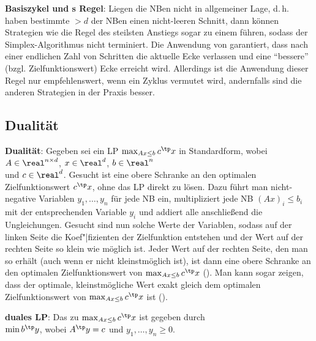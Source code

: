 \linie

\textbf{Basiszykel und s Regel}:
Liegen die NBen nicht in allgemeiner Lage, d.\,h. haben bestimmte $> d$ der NBen einen nicht-leeren
Schnitt, dann können Strategien wie die Regel des steilsten Anstiegs sogar zu einem
 führen, sodass der Simplex-Algorithmus nicht terminiert.
Die Anwendung von  garantiert, dass nach einer endlichen Zahl von
Schritten die aktuelle Ecke verlassen und eine "`bessere"' (bzgl. Zielfunktionswert) Ecke erreicht
wird.
Allerdings ist die Anwendung dieser Regel nur empfehlenswert, wenn ein Zyklus vermutet wird,
andernfalls sind die anderen Strategien in der Praxis besser.

\pagebreak

\subsection{%
    Dualität%
}

\textbf{Dualität}:
Gegeben sei ein LP $\max_{Ax \le b} c^\tp x$ in Standardform,
wobei $A \in \real^{n \times d}$, $x \in \real^d$, $b \in \real^n$\\
und $c \in \real^d$.
Gesucht ist eine obere Schranke an den optimalen Zielfunktionswert $c^\tp x$,
ohne das LP direkt zu lösen.
Dazu führt man nicht-negative Variablen $y_1, \dotsc, y_n$ für jede NB ein, multipliziert
jede NB $(Ax)_i \le b_i$ mit der entsprechenden Variable $y_i$
und addiert alle anschließend die Ungleichungen.
Gesucht sind nun solche Werte der Variablen, sodass auf der linken Seite die Koef"|fizienten
der Zielfunktion entstehen und der Wert auf der rechten Seite so klein wie möglich ist.
Jeder Wert auf der rechten Seite, den man so erhält (auch wenn er nicht kleinstmöglich ist),
ist dann eine obere Schranke an den optimalen Zielfunktionswert von
$\max_{Ax \le b} c^\tp x$
().
Man kann sogar zeigen, dass der optimale, kleinstmögliche Wert exakt gleich dem optimalen
Zielfunktionswert von $\max_{Ax \le b} c^\tp x$ ist ().

\textbf{duales LP}:
Das zu $\max_{Ax \le b} c^\tp x$  ist gegeben durch\\
$\min b^\tp y$, wobei $A^\tp y = c$ und $y_1, \dotsc, y_n \ge 0$.

\linie

